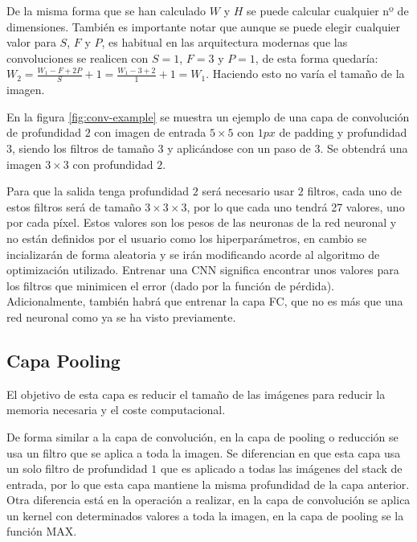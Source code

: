 De la misma forma que se han calculado $W$ y $H$ se puede calcular cualquier nº de dimensiones. También es importante notar que aunque se puede elegir cualquier valor para $S$, $F$ y $P$, es habitual en las arquitectura modernas que las convoluciones se realicen con $S=1$, $F=3$ y $P=1$, de esta forma quedaría: $W_2 = \frac{W_1-F+2P}{S} + 1 = \frac{W_1 - 3 + 2}{1} + 1 = W_1$. Haciendo esto no varía el tamaño de la imagen.

En la figura \ref{fig:conv-example}\cite{Li2020} se muestra un ejemplo de una capa de convolución de profundidad $2$ con imagen de entrada $5 \times 5$ con $1 px$ de padding y profundidad $3$, siendo los filtros de tamaño $3$ y aplicándose con un paso de $3$. Se obtendrá una imagen $3\times 3$ con profundidad $2$.

Para que la salida tenga profundidad $2$ será necesario usar $2$ filtros, cada uno de estos filtros será de tamaño $3\times 3 \times 3$, por lo que cada uno tendrá 27 valores, uno por cada píxel. Estos valores son los pesos de las neuronas de la red neuronal y no están definidos por el usuario como los hiperparámetros, en cambio se incializarán de forma aleatoria y se irán modificando acorde al algoritmo de optimización utilizado. Entrenar una CNN significa encontrar unos valores para los filtros que minimicen el error (dado por la función de pérdida). Adicionalmente, también habrá que entrenar la capa FC, que no es más que una red neuronal como ya se ha visto previamente.


\newpage\subsection{Capa Pooling}\label{cnn_capa_pooling}

El objetivo de esta capa es reducir el tamaño de las imágenes para reducir la memoria necesaria y el coste computacional.

De forma similar a la capa de convolución, en la capa de pooling o reducción se usa un filtro que se aplica a toda la imagen. Se diferencian en que esta capa usa un solo filtro de profundidad $1$ que es aplicado a todas las imágenes del stack de entrada, por lo que esta capa mantiene la misma profundidad de la capa anterior. Otra diferencia está en la operación a realizar, en la capa de convolución se aplica un kernel con determinados valores a toda la imagen, en la capa de pooling se la función MAX.

